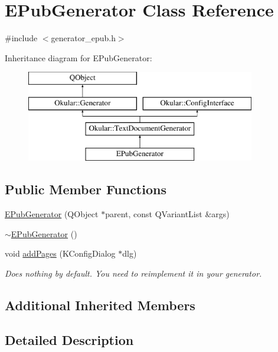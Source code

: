 \hypertarget{classEPubGenerator}{\section{E\+Pub\+Generator Class Reference}
\label{classEPubGenerator}
}


{\ttfamily \#include $<$generator\+\_\+epub.\+h$>$}

Inheritance diagram for E\+Pub\+Generator\+:\begin{figure}[H]
\begin{center}
\leavevmode
\includegraphics[height=4.000000cm]{classEPubGenerator}
\end{center}
\end{figure}
\subsection*{Public Member Functions}
\begin{DoxyCompactItemize}
\item 
\hyperlink{classEPubGenerator_affc2563b9a341e62f488e6914d99ff31}{E\+Pub\+Generator} (Q\+Object $\ast$parent, const Q\+Variant\+List \&args)
\item 
\hyperlink{classEPubGenerator_ac80234dd529d7bdf06792037a4d5c531}{$\sim$\+E\+Pub\+Generator} ()
\item 
void \hyperlink{classEPubGenerator_a9ef2fd420a698d07236def3a9162fab4}{add\+Pages} (K\+Config\+Dialog $\ast$dlg)
\begin{DoxyCompactList}\small\item\em Does nothing by default. You need to reimplement it in your generator. \end{DoxyCompactList}\end{DoxyCompactItemize}
\subsection*{Additional Inherited Members}


\subsection{Detailed Description}


